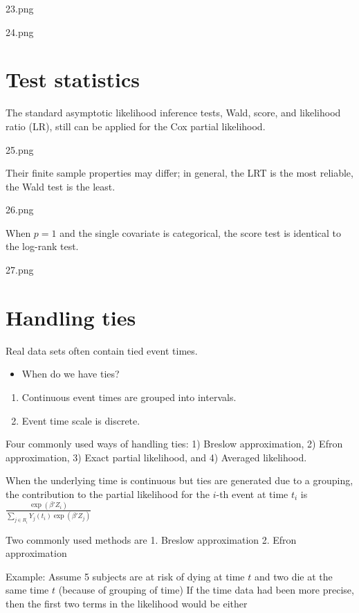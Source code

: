 \documentclass[
]{book}
\providecommand{\tightlist}{%
  \setlength{\itemsep}{0pt}\setlength{\parskip}{0pt}}
\theoremstyle{definition}
\theoremstyle{definition}
\theoremstyle{definition}
\theoremstyle{definition}
\theoremstyle{remark}
\begin{document}
23.png

24.png

\hypertarget{test-statistics}{%
\section{Test statistics}\label{test-statistics}}

The standard asymptotic likelihood inference tests, Wald, score, and likelihood ratio (LR), still can be applied for the Cox partial likelihood.

25.png

Their finite sample properties may differ; in general, the LRT is the most reliable, the Wald test is the least.

26.png

When \(p = 1\) and the single covariate is categorical, the score test is identical to the log-rank test.

27.png

\hypertarget{handling-ties}{%
\section{Handling ties}\label{handling-ties}}

Real data sets often contain tied event times.

\begin{itemize}
\tightlist
\item
  When do we have ties?
\end{itemize}

\begin{enumerate}
\def\labelenumi{\arabic{enumi}.}
\tightlist
\item
  Continuous event times are grouped into intervals.
\item
  Event time scale is discrete.
\end{enumerate}

Four commonly used ways of handling ties: 1) Breslow approximation, 2) Efron approximation, 3) Exact partial likelihood, and 4) Averaged likelihood.

When the underlying time is continuous but ties are generated due to a grouping, the contribution to the partial likelihood for the \(i\)-th event at time \(t_i\) is \(\frac{\exp(\beta ' Z_i)}{ \sum\limits_{j \in R_i} Y_j(t_i) \exp(\beta ' Z_j)}\)

Two commonly used methods are
1. Breslow approximation
2. Efron approximation

Example: Assume 5 subjects are at risk of dying at time \(t\) and two die at the same time \(t\) (because of grouping of time) If the time data had been more precise, then the first two terms in the likelihood would be either
\end{document}
